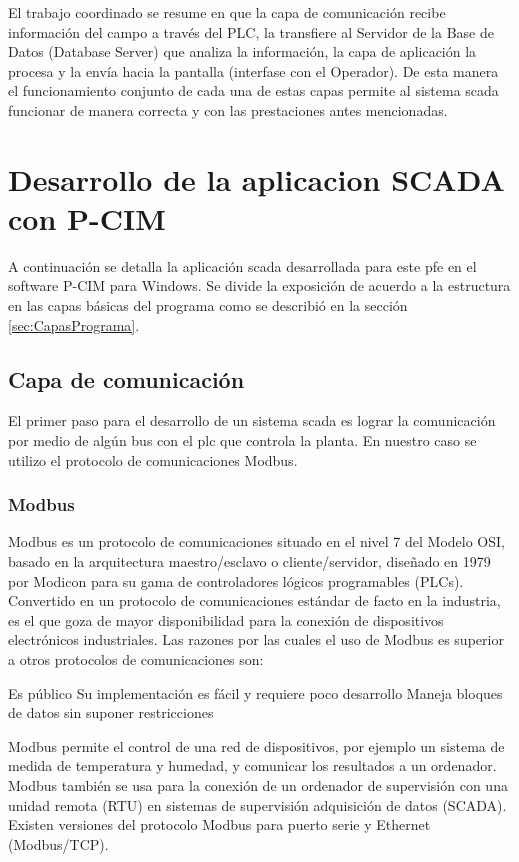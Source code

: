 El trabajo coordinado se resume en que la capa de comunicación recibe información del campo a 
través del PLC, la transfiere al Servidor de la Base de Datos (Database Server) que analiza la 
información, la capa de aplicación la procesa y la envía hacia la pantalla (interfase con el Operador).
De esta manera el funcionamiento conjunto de cada una de estas capas permite al sistema 
\gls{scada} funcionar de manera correcta y con las prestaciones antes mencionadas.

\section{Desarrollo de la aplicacion SCADA con P-CIM}

A continuación se detalla la aplicación \gls{scada} desarrollada para este \gls{pfe} en el software
P-CIM para Windows. Se divide la exposición de acuerdo a la estructura en las capas básicas del 
programa como se describió en la sección \ref{sec:CapasPrograma}.

\subsection{Capa de comunicación}
\label{subsec:CapaComunicacion}

El primer paso para el desarrollo de un sistema \gls{scada} es lograr la comunicación por medio
de algún bus con el \gls{plc} que controla la planta. En nuestro caso se utilizo el protocolo de
comunicaciones Modbus.

\subsubsection{Modbus}
Modbus es un protocolo de comunicaciones situado en el nivel 7 
del Modelo OSI, basado en la 
arquitectura maestro/esclavo o cliente/servidor, diseñado en 1979 por Modicon para su gama de 
controladores lógicos programables (PLCs). Convertido en un protocolo de comunicaciones estándar 
de facto en la industria, es el que goza de mayor disponibilidad para la conexión de dispositivos 
electrónicos industriales. Las razones por las cuales el uso de Modbus es superior a otros protocolos 
de comunicaciones son:

Es público
Su implementación es fácil y requiere poco desarrollo
Maneja bloques de datos sin suponer restricciones

Modbus permite el control de una red de dispositivos, por ejemplo un sistema de medida de temperatura y 
humedad, y comunicar los resultados a un ordenador. Modbus también se usa para la conexión de un ordenador 
de supervisión con una unidad remota (RTU) en sistemas de supervisión adquisición de datos (SCADA). 
  Existen versiones del protocolo Modbus para puerto serie y Ethernet (Modbus/TCP).

